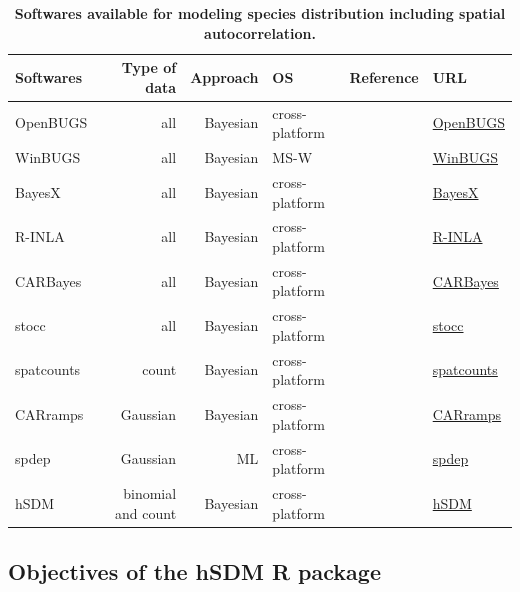 \documentclass[a4paper, 12pt, leqno]{article}\usepackage[]{graphicx}\usepackage[]{color}
\begin{document}
\begin{landscape}
  \begin{table}
    \begin{center}
      \begin{longtable}{@{}lrrL{3cm}L{3cm}R{3cm}@{}}
        \toprule
        Softwares & Type of data & Approach & OS & Reference & URL \\
        \midrule
        OpenBUGS & all & Bayesian & cross-platform & \citet{Lunn2009} &
        \href{http://www.openbugs.net}{OpenBUGS}\\
        WinBUGS & all & Bayesian & MS-W & \citet{Lunn2009} & 
        \href{http://www.mrc-bsu.cam.ac.uk/software/bugs/the-bugs-project-winbugs/}{WinBUGS} \\
        BayesX & all & Bayesian & cross-platform & \citet{Brezger2005} &
        \href{http://www.stat.uni-muenchen.de/~bayesx/bayesx.html}{BayesX} \\ 
        R-INLA & all & Bayesian & cross-platform & \citet{Rue2009} & \href{http://www.r-inla.org/}{R-INLA} \\
        CARBayes & all & Bayesian & cross-platform & \citet{Lee2013} &
        \href{http://CRAN.R-project.org/package=CARBayes}{CARBayes} \\
        stocc & all & Bayesian & cross-platform & \citet{Johnson2013} & 
        \href{http://CRAN.R-project.org/package=stocc}{stocc} \\ 
        spatcounts & count & Bayesian & cross-platform & ~ &
        \href{http://CRAN.R-project.org/package=spatcounts}{spatcounts} \\
        CARramps & Gaussian & Bayesian & cross-platform & ~ & 
        \href{http://CRAN.R-project.org/package=CARramps}{CARramps}\\
        spdep & Gaussian & ML & cross-platform & ~ &
        \href{http://CRAN.R-project.org/package=spdep}{spdep} \\
        hSDM & binomial and count & Bayesian & cross-platform & ~ & \href{http://hSDM.sf.net}{hSDM}\\
        \bottomrule
      \end{longtable}
    \end{center}
    \caption{\textbf{Softwares available for modeling species distribution including
        spatial autocorrelation.}}
    \label{tab:softwares-spatial} 
  \end{table}
\end{landscape}

\subsection{Objectives of the hSDM R package}
\end{document}
